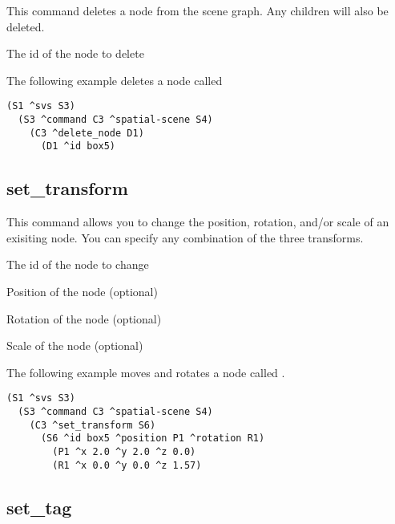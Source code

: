 This command deletes a node from the scene graph. Any children will also be deleted.

\begin{description}
	\item{} The id of the node to delete
\end{description}

The following example deletes a node called 

\begin{verbatim}
(S1 ^svs S3)
  (S3 ^command C3 ^spatial-scene S4)
    (C3 ^delete_node D1)
      (D1 ^id box5)
\end{verbatim}


\subsection{set\_transform}

This command allows you to change the position, rotation, and/or scale of an
exisiting node. You can specify any combination of the three transforms.

\begin{description}
	\item{} The id of the node to change
	\item{} Position of the node (optional)
	\item{} Rotation of the node (optional)
	\item{} Scale of the node (optional)
\end{description}

The following example moves and rotates a node called .

\begin{verbatim}
(S1 ^svs S3)
  (S3 ^command C3 ^spatial-scene S4)
    (C3 ^set_transform S6)
      (S6 ^id box5 ^position P1 ^rotation R1)
        (P1 ^x 2.0 ^y 2.0 ^z 0.0)
        (R1 ^x 0.0 ^y 0.0 ^z 1.57)
\end{verbatim}


\subsection{set\_tag}

